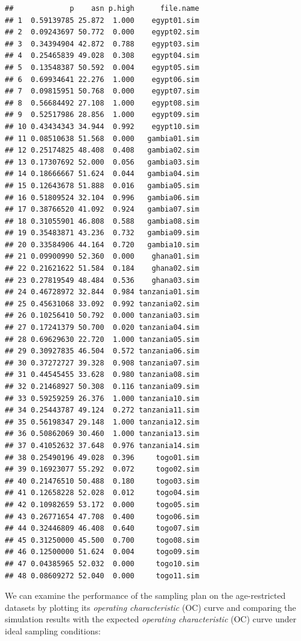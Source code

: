 \documentclass[12pt,a4paper]{book}
\theoremstyle{definition}
\theoremstyle{definition}
\theoremstyle{definition}
\theoremstyle{remark}
\begin{document}
\begin{verbatim}
##             p    asn p.high      file.name
## 1  0.59139785 25.872  1.000    egypt01.sim
## 2  0.09243697 50.772  0.000    egypt02.sim
## 3  0.34394904 42.872  0.788    egypt03.sim
## 4  0.25465839 49.028  0.308    egypt04.sim
## 5  0.13548387 50.592  0.004    egypt05.sim
## 6  0.69934641 22.276  1.000    egypt06.sim
## 7  0.09815951 50.768  0.000    egypt07.sim
## 8  0.56684492 27.108  1.000    egypt08.sim
## 9  0.52517986 28.856  1.000    egypt09.sim
## 10 0.43434343 34.944  0.992    egypt10.sim
## 11 0.08510638 51.568  0.000   gambia01.sim
## 12 0.25174825 48.408  0.408   gambia02.sim
## 13 0.17307692 52.000  0.056   gambia03.sim
## 14 0.18666667 51.624  0.044   gambia04.sim
## 15 0.12643678 51.888  0.016   gambia05.sim
## 16 0.51809524 32.104  0.996   gambia06.sim
## 17 0.38766520 41.092  0.924   gambia07.sim
## 18 0.31055901 46.808  0.588   gambia08.sim
## 19 0.35483871 43.236  0.732   gambia09.sim
## 20 0.33584906 44.164  0.720   gambia10.sim
## 21 0.09900990 52.360  0.000    ghana01.sim
## 22 0.21621622 51.584  0.184    ghana02.sim
## 23 0.27819549 48.484  0.536    ghana03.sim
## 24 0.46728972 32.844  0.984 tanzania01.sim
## 25 0.45631068 33.092  0.992 tanzania02.sim
## 26 0.10256410 50.792  0.000 tanzania03.sim
## 27 0.17241379 50.700  0.020 tanzania04.sim
## 28 0.69629630 22.720  1.000 tanzania05.sim
## 29 0.30927835 46.504  0.572 tanzania06.sim
## 30 0.37272727 39.328  0.908 tanzania07.sim
## 31 0.44545455 33.628  0.980 tanzania08.sim
## 32 0.21468927 50.308  0.116 tanzania09.sim
## 33 0.59259259 26.376  1.000 tanzania10.sim
## 34 0.25443787 49.124  0.272 tanzania11.sim
## 35 0.56198347 29.148  1.000 tanzania12.sim
## 36 0.50862069 30.460  1.000 tanzania13.sim
## 37 0.41052632 37.648  0.976 tanzania14.sim
## 38 0.25490196 49.028  0.396     togo01.sim
## 39 0.16923077 55.292  0.072     togo02.sim
## 40 0.21476510 50.488  0.180     togo03.sim
## 41 0.12658228 52.028  0.012     togo04.sim
## 42 0.10982659 53.172  0.000     togo05.sim
## 43 0.26771654 47.708  0.400     togo06.sim
## 44 0.32446809 46.408  0.640     togo07.sim
## 45 0.31250000 45.500  0.700     togo08.sim
## 46 0.12500000 51.624  0.004     togo09.sim
## 47 0.04385965 52.032  0.000     togo10.sim
## 48 0.08609272 52.040  0.000     togo11.sim
\end{verbatim}

We can examine the performance of the sampling plan on the
age-restricted datasets by plotting its \emph{operating characteristic}
(OC) curve and comparing the simulation results with the expected
\emph{operating characteristic} (OC) curve under ideal sampling
conditions:
\end{document}
